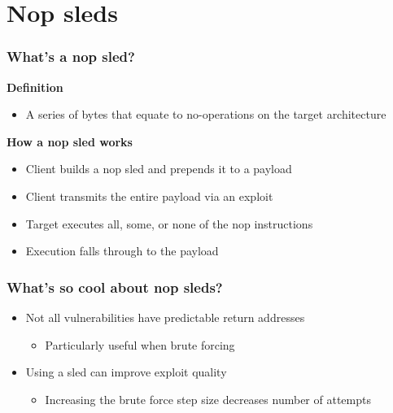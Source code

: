 \documentclass{beamer}
\newenvironment{sitemize}{\vspace{1mm}\begin{itemize}\itemsep 4pt\small}{\end{itemize}}
\begin{document}
\section{Nop sleds}

%

\begin{frame}[t]
    \frametitle{What's a nop sled?}

    \textbf{Definition}
    \begin{sitemize}
        \item A series of bytes that equate to no-operations on the
        target architecture
    \end{sitemize}

    \pause
    \textbf{How a nop sled works}
    \begin{sitemize}
        \pause
        \item Client builds a nop sled and prepends it to a payload
        \pause
        \item Client transmits the entire payload via an exploit
        \pause
        \item Target executes all, some, or none of the nop
        instructions
        \pause
        \item Execution falls through to the payload
    \end{sitemize}

\end{frame}

\begin{frame}[t]
    \frametitle{What's so cool about nop sleds?}

    \begin{sitemize}
        \item Not all vulnerabilities have predictable return
        addresses
        \begin{sitemize}
            \item Particularly useful when brute forcing
        \end{sitemize}

        \pause
        \item Using a sled can improve exploit quality
        \begin{sitemize}
            \item Increasing the brute force step size decreases
        number of attempts
        \end{sitemize}
    \end{sitemize}
\end{frame}
\end{document}

